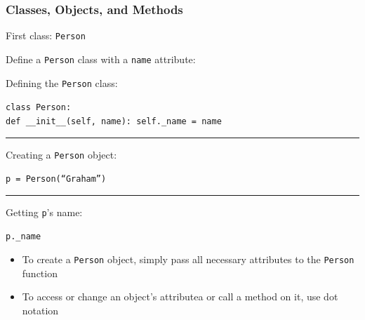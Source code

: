 \documentclass{beamer}
\newcommand{\code}[1]{\texttt{#1}}
\newcommand{\tab}{\hspace*{22pt}}
\begin{document}
\begin{frame}	
	\frametitle{Classes, Objects, and Methods}
	
	\begin{block}{First class: \code{Person}}
		\begin{scriptsize}
		Define a \code{Person} class with a \code{name} attribute:
		
		\vspace{15pt}
			Defining the \code{Person} class:
		
			\vspace{10pt}
			\code{class Person: \\
					\tab def \_\_init\_\_(self, name):
					\tab \tab self.\_name = name
			}
			
			\rule[0pt]{\linewidth}{1pt}
		
			\vspace{10pt}
			Creating a \code{Person} object:
			
			\vspace{10pt}
			\code{p = Person(``Graham'')
			}
			
			\rule[0pt]{\linewidth}{1pt}
		
			\vspace{10pt}
			Getting \code{p}'s name:
			
			\vspace{10pt}
			\code{p.\_name
			}
		\endminipage\hfill
			\begin{itemize}
				\item To create a \code{Person} object, simply pass all necessary attributes to the \code{Person} function
				\begin{itemize}
				\end{itemize}
				\item To access or change an object's attributea or call a method on it, use dot notation
			\end{itemize}
		\endminipage\hfill
		\end{scriptsize}
	\end{block}
	
\end{frame}
\end{document}
